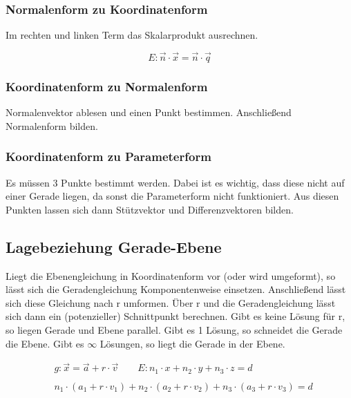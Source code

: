 \subsubsection*{Normalenform zu Koordinatenform}

Im rechten und linken Term das Skalarprodukt ausrechnen.

\begin{equation*}
    E: \vec {n} \cdot \vec{x} = \vec{n} \cdot \vec{q}
\end{equation*}

\subsubsection*{Koordinatenform zu Normalenform}

Normalenvektor ablesen und einen Punkt bestimmen. Anschließend
Normalenform bilden.

\subsubsection*{Koordinatenform zu Parameterform}

Es müssen 3 Punkte bestimmt werden. Dabei ist es wichtig, dass diese nicht auf einer Gerade
liegen, da sonst die Parameterform nicht funktioniert. Aus diesen Punkten lassen sich
dann Stützvektor und Differenzvektoren bilden.

\subsection{Lagebeziehung Gerade-Ebene}

Liegt die Ebenengleichung in Koordinatenform vor (oder wird umgeformt), so lässt
sich die Geradengleichung Komponentenweise einsetzen. Anschließend lässt sich diese Gleichung
nach r umformen. Über r und die Geradengleichung lässt sich dann ein (potenzieller)
Schnittpunkt berechnen.
Gibt es keine Lösung für r, so liegen Gerade und Ebene parallel.
Gibt es 1 Lösung, so schneidet die Gerade die Ebene.
Gibt es $\infty$ Lösungen, so liegt die Gerade in der Ebene.

\begin{align*}
    & g: \vec{x} = \vec{a} + r \cdot \vec{v}
    \qquad E: n_1 \cdot x + n_2 \cdot y + n_3 \cdot z = d \\
    \\
    & n_1 \cdot (a_1 + r \cdot v_1) + n_2 \cdot (a_2 + r \cdot v_2) + n_3 \cdot (a_3 + r \cdot v_3) = d
\end{align*}

